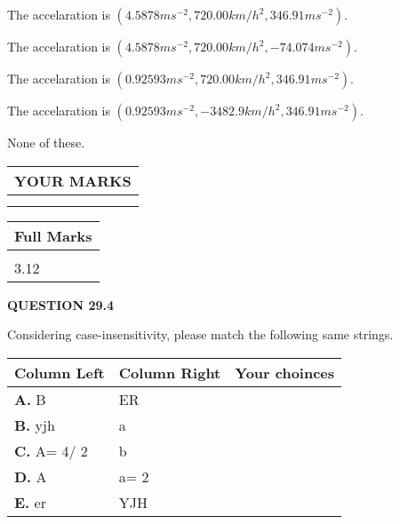 \documentclass[12pt]{article}
\begin{document}
 
The accelaration is
$(
4.5878ms^{-2},
720.00km/h^2,
346.91ms^{-2}
).
$
 
 
The accelaration is
$(
4.5878ms^{-2},
720.00km/h^2,
-74.074ms^{-2}
).
$
 
 
The accelaration is
$(
0.92593ms^{-2},
720.00km/h^2,
346.91ms^{-2}
).
$
 
 
The accelaration is
$(
0.92593ms^{-2},
-3482.9km/h^2,
346.91ms^{-2}
).
$
 
 
 None of these.
 
 
 
 

 
\vspace{0.3in}
  
\vspace{0.2in}
  
\noindent\begin{tabular}{|l|}
\hline
 YOUR MARKS  \\
\hline
 \\ 
 \\ 
\hline
\end{tabular}
\hspace{0.05in} \begin{tabular}{|l|}
\hline
 Full Marks  \\
\hline
 \\ 
3.12 \\
\hline
\end{tabular}
{\textbf{\Large{QUESTION
29.4 
}}}
  
  
Considering case-insensitivity, please match the following same strings.
  
  
\begin{tabular}{|l|l|l|}
 \hline
 Column Left & Column Right  & Your choinces \\ 
 \hline
{\textbf{\large{
A.}}}
B
  & 
ER
 & 
 \\ 
 \hline
{\textbf{\large{
B.}}}
yjh
  & 
a
 & 
 \\ 
 \hline
{\textbf{\large{
C.}}}
 A= %
4/ %
2

  & 
b
 & 
 \\ 
 \hline
{\textbf{\large{
D.}}}
A
  & 
 a= %
2
 & 
 \\ 
 \hline
{\textbf{\large{
E.}}}
er
  & 
YJH
 & 
 \\ 
 \hline
 \end{tabular}
  
  
 
\end{document}
